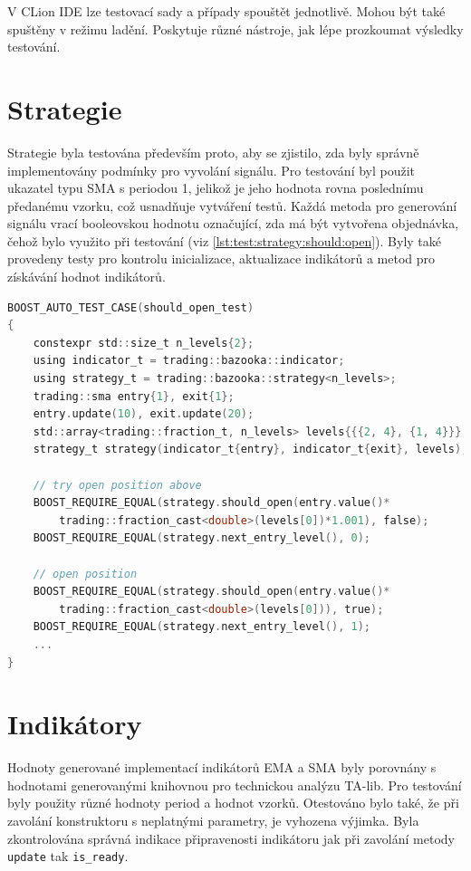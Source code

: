 V CLion IDE lze testovací sady a případy spouštět jednotlivě.
Mohou být také spuštěny v režimu ladění.
Poskytuje různé nástroje, jak lépe prozkoumat výsledky testování.

\section{Strategie}
Strategie byla testována především proto, aby se zjistilo, zda byly správně implementovány podmínky pro vyvolání signálu.
Pro testování byl použit ukazatel typu SMA s periodou 1, jelikož je jeho hodnota rovna poslednímu předanému vzorku, což usnadňuje vytváření testů.
Každá metoda pro generování signálu vrací booleovskou hodnotu označující, zda má být vytvořena objednávka, čehož bylo využito při testování (viz \ref{lst:test:strategy:should:open}).
Byly také provedeny testy pro kontrolu inicializace, aktualizace indikátorů a metod pro získávání hodnot indikátorů.

\begin{lstlisting}[caption={~Testování podmínek pro signalizaci vytvoření otevírací objednávky},label={lst:test:strategy:should:open},captionpos=t,abovecaptionskip=-\medskipamount,belowcaptionskip=\medskipamount,language=C]
BOOST_AUTO_TEST_CASE(should_open_test)
{
    constexpr std::size_t n_levels{2};
    using indicator_t = trading::bazooka::indicator;
    using strategy_t = trading::bazooka::strategy<n_levels>;
    trading::sma entry{1}, exit{1};
    entry.update(10), exit.update(20);
    std::array<trading::fraction_t, n_levels> levels{{{2, 4}, {1, 4}}};
    strategy_t strategy(indicator_t{entry}, indicator_t{exit}, levels);

    // try open position above
    BOOST_REQUIRE_EQUAL(strategy.should_open(entry.value()*
        trading::fraction_cast<double>(levels[0])*1.001), false);
    BOOST_REQUIRE_EQUAL(strategy.next_entry_level(), 0);

    // open position
    BOOST_REQUIRE_EQUAL(strategy.should_open(entry.value()*
        trading::fraction_cast<double>(levels[0])), true);
    BOOST_REQUIRE_EQUAL(strategy.next_entry_level(), 1);
    ...
}
\end{lstlisting}

\section{Indikátory}
Hodnoty generované implementací indikátorů EMA a SMA byly porovnány s hodnotami generovanými knihovnou pro technickou analýzu TA-lib.
Pro testování byly použity různé hodnoty period a hodnot vzorků.
Otestováno bylo také, že při zavolání konstruktoru s neplatnými parametry, je vyhozena výjimka.
Byla zkontrolována správná indikace připravenosti indikátoru jak při zavolání metody \texttt{update} tak \texttt{is\_ready}.

